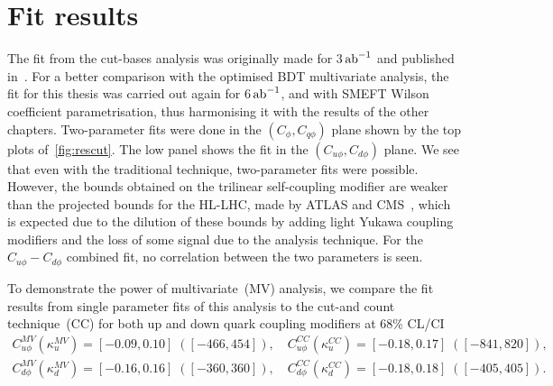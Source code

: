 \section{Fit results\label{sec:resultsly}}
The fit from the cut-bases analysis was originally made for 3$\,{\rm ab}^{-1}$ and published in~\cite{Alasfar:2019pmn}. For a better comparison with the optimised BDT multivariate analysis, the fit for this thesis was carried out again for 6$\,{\rm ab}^{-1}$, and with SMEFT Wilson coefficient parametrisation, thus harmonising it with the results of the other chapters. Two-parameter fits were done in the $(C_\phi,C_{q\phi})$ plane shown by the top plots of~\autoref{fig:rescut}. The low panel shows the fit in the $(C_{u\phi},C_{d\phi})$ plane.  We see that even with the traditional technique, two-parameter fits were possible. However, the bounds obtained on the trilinear self-coupling modifier are weaker than the projected bounds for the HL-LHC, made by ATLAS and CMS~\cite{ATL-PHYS-PUB-2018-053, ATLAS:2018rvj,CMS-PAS-FTR-18-011}, which is expected due to the dilution of these bounds by adding light Yukawa coupling modifiers and the loss of some signal due to the analysis technique. For the $C_{u\phi}-C_{d\phi}$ combined fit, no correlation between the two parameters is seen. 
\par To demonstrate the power of multivariate~(MV) analysis, we compare the fit results from single parameter fits of this analysis to the cut-and count technique~(CC) for both up and down quark coupling modifiers at 68\% CL/CI 
\begin{eqnarray}
	C_{u\phi}^{MV} \left(\kappa_u^{MV}\right) = [-0.09, 0.10] \;([-466, 454]),\quad C_{u\phi}^{CC} (\kappa_u^{CC}) = [-0.18, 0.17] \;([-841, 820]), \nonumber\\
	C_{d\phi}^{MV} (\kappa_d^{MV}) = [-0.16, 0.16] \;([-360, 360]),\quad C_{d\phi}^{CC} (\kappa_d^{CC}) = [-0.18, 0.18] \;([-405, 405]). \nonumber\\
\end{eqnarray}
